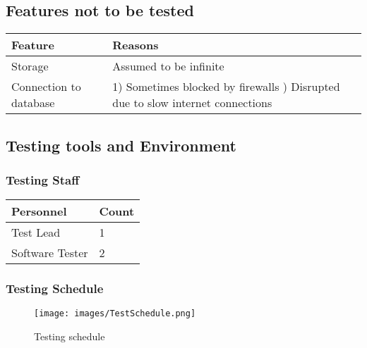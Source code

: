 \documentclass[12pt]{article}
\begin{document}
\subsection{Features not to be tested}
\begin{center}
	\begin{longtable}{ | p{7cm} | p{7cm} | }
	\hline 
		\textbf{Feature} & \textbf{Reasons}\\
	\hline
		Storage & Assumed to be infinite\\
	\hline
		Connection to database & 1) Sometimes blocked by firewalls \newline 2) Disrupted due to slow internet connections\\
	\hline
	\end{longtable}
\end{center}

\subsection{Testing tools and Environment}
	\subsubsection{Testing Staff}
	\begin{center}
	\begin{longtable}{ | p{3cm} | p{3cm} | }
		\hline
			\textbf{Personnel} & \textbf{Count}\\
		\hline
			Test Lead & 1\\
		\hline
			Software Tester & 2\\
		\hline
	\end{longtable}
	\end{center}
	\subsubsection{Testing Schedule}
		\begin{figure} 
		    \centering
		    \texttt{[image: images/TestSchedule.png]}
		    \caption{Testing schedule}
		\end{figure}
\end{document}
